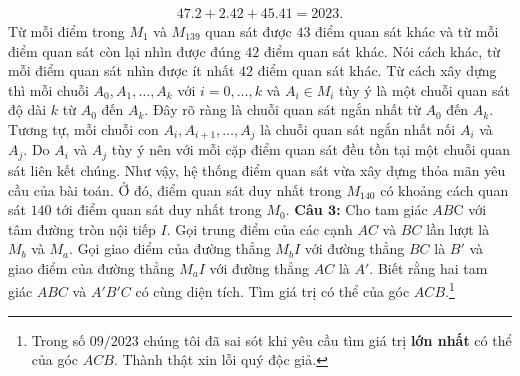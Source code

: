 \begin{multicols}{2}
		\begin{align*}
			47.2 + 2.42 + 45.41 = 2023.
		\end{align*}
		Từ mỗi điểm trong $M_1$ và $M_{139}$ quan sát được $43$ điểm quan sát khác và từ mỗi điểm quan sát còn lại nhìn được đúng $42$ điểm quan sát khác. Nói cách khác, từ mỗi điểm quan sát nhìn được ít nhất $42$ điểm quan sát khác. Từ cách xây dựng thì mỗi chuỗi $A_0, A_1, \ldots, A_k$ với $i = 0, \ldots, k$ và $A_i \in M_i$ tùy ý là một chuỗi quan sát độ dài $k$ từ $A_0$ đến $A_k$. Đây rõ ràng là chuỗi quan sát ngắn nhất từ $A_0$ đến $A_k$. Tương tự, mỗi chuỗi con $A_i, A_{i+1}, \ldots, A_j$ là chuỗi quan sát ngắn nhất nối $A_i$ và $A_j$. Do $A_i$ và $A_j$ tùy ý nên với mỗi cặp điểm quan sát đều tồn tại một chuỗi quan sát liên kết chúng. Như vậy, hệ thống điểm quan sát vừa xây dựng thỏa mãn yêu cầu của bài toán. Ở đó, điểm quan sát duy nhất trong $M_{140}$ có khoảng cách quan sát $140$ tới điểm quan sát duy nhất trong $M_0$.
		\vskip 0.1cm
	\textbf{\color{cackithi}Câu $\pmb{3}$:} Cho tam giác $AB$C với tâm đường tròn nội tiếp $I$. Gọi trung điểm của các cạnh $AC$ và $BC$ lần lượt là $M_b$ và $M_a$. Gọi giao điểm của đường thẳng $M_bI$ với đường thẳng $BC$ là $B'$ và giao điểm của đường thẳng $M_aI$ với đường thẳng $AC$ là $A'$. Biết rằng hai tam giác $ABC$ và $A'B'C$ có cùng diện tích. 
	\vskip 0.1cm
	Tìm giá trị có thể của góc $ACB$.\footnote{\color{cackithi}Trong số $09/2023$ chúng tôi đã sai sót khi yêu cầu tìm giá trị \textbf{\color{cackithi}lớn nhất} có thể của góc $ACB$. Thành thật xin lỗi quý độc giả.}	
		\begin{figure}[H]
			\vspace*{-10pt}
			\centering
			\captionsetup{labelformat= empty, justification=centering}
\end{figure}
\end{multicols}
